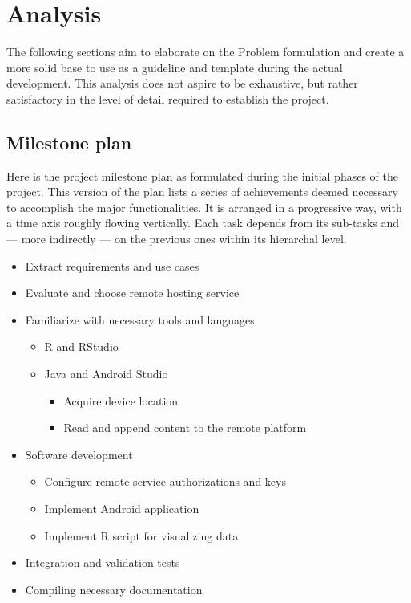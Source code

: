 \chapter{Analysis}
The following sections aim to elaborate on the Problem formulation and create a more solid base to use as a guideline and template during the actual development.
This analysis does not aspire to be exhaustive, but rather satisfactory in the level of detail required to establish the project.

\section{Milestone plan}
Here is the project milestone plan as formulated during the initial phases of the project.
This version of the plan lists a series of achievements deemed necessary to accomplish the major functionalities.
It is arranged in a progressive way, with a time axis roughly flowing vertically.
Each task depends from its sub-tasks and --- more indirectly --- on the previous ones within its hierarchal level.


\renewcommand{\labelitemi}{\textbullet}
\renewcommand{\labelitemii}{\textbullet}
\renewcommand{\labelitemiii}{\textbullet}
\renewcommand{\labelitemiv}{\textbullet}
\begin{itemize}
	\item Extract requirements and use cases
	\item Evaluate and choose remote hosting service
	\item Familiarize with necessary tools and languages
	\begin{itemize}
		\item R and RStudio
		\item Java and Android Studio
		\begin{itemize}
			\item Acquire device location
			\item Read and append content to the remote platform
		\end{itemize}
	\end{itemize}
	\item Software development
	\begin{itemize}
		\item Configure remote service authorizations and keys
		\item Implement Android application
		\item Implement R script for visualizing data
	\end{itemize}
	\item Integration and validation tests
	\item Compiling necessary documentation
\end{itemize}

